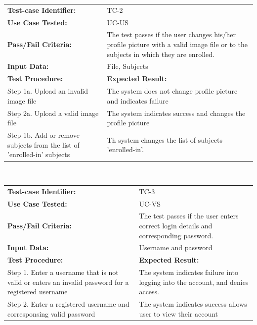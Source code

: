 \documentclass[12pt]{article}
\begin{document}
\begin{tabular}{| p{8cm} | p{8cm} |} \hline
	\textbf{Test-case Identifier:}& TC-2\\
	\textbf{Use Case Tested:}& UC-US\\
	\textbf{Pass/Fail Criteria:}& The test passes if the user changes his/her profile picture with a valid image file or to the subjects in which they are enrolled.\\
	\textbf{Input Data:}& File, Subjects\\\hline
	\textbf{Test Procedure:}& \textbf{Expected Result:} \\\hline
	Step 1a. Upload an invalid image file & The system does not change profile picture and indicates failure\\
	Step 2a. Upload a valid image file & The system indicates success and changes the profile picture\\
		Step 1b. Add or remove subjects from the list of 'enrolled-in' subjects & Th system changes the list of subjects 'enrolled-in'.  \\\hline
\end{tabular}
\\

\begin{tabular}{| p{8cm} | p{8cm} |} \hline
	\textbf{Test-case Identifier:}& TC-3\\
	\textbf{Use Case Tested:}& UC-VS\\
	\textbf{Pass/Fail Criteria:}& The test passes if the user enters correct login details and corresponding password.\\
	\textbf{Input Data:}& Username and password\\\hline
	\textbf{Test Procedure:}& \textbf{Expected Result:} \\\hline
	Step 1. Enter a username that is not valid or enters an invalid password for a registered username & The system indicates failure into logging into the account, and denies access. \\
	Step 2. Enter a registered username and corresponsing valid password  & The system indicates success allows user to view their account\\
		\hline
\end{tabular}
\\
\end{document}

